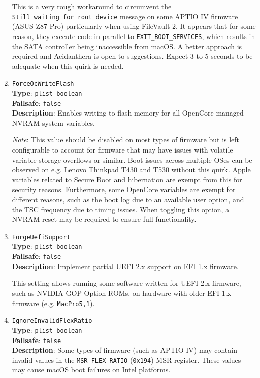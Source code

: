 \documentclass[]{article}
\begin{document}
\begin{enumerate}
  This is a very rough workaround to circumvent the \texttt{Still\ waiting\ for\ root\ device} message
  on some APTIO IV firmware (ASUS Z87-Pro) particularly when using FileVault 2.
  It appears that for some reason, they execute code in parallel to \texttt{EXIT\_BOOT\_SERVICES},
  which results in the SATA controller being inaccessible from macOS. A better approach is required
  and Acidanthera is open to suggestions. Expect 3 to 5 seconds to be adequate when this quirk is needed.

\item
  \texttt{ForceOcWriteFlash}\\
  \textbf{Type}: \texttt{plist\ boolean}\\
  \textbf{Failsafe}: \texttt{false}\\
  \textbf{Description}: Enables writing to flash memory for all OpenCore-managed NVRAM system variables.

  \emph{Note}: This value should be disabled on most types of firmware but is
  left configurable to account for firmware that may have issues with volatile
  variable storage overflows or similar. Boot issues across multiple OSes can be
  observed on e.g. Lenovo Thinkpad T430 and T530 without this quirk. Apple
  variables related to Secure Boot and hibernation are exempt from this for
  security reasons. Furthermore, some OpenCore variables are exempt for
  different reasons, such as the boot log due to an available user option, and
  the TSC frequency due to timing issues. When toggling this option, a NVRAM
  reset may be required to ensure full functionality.

\item
  \texttt{ForgeUefiSupport}\\
  \textbf{Type}: \texttt{plist\ boolean}\\
  \textbf{Failsafe}: \texttt{false}\\
  \textbf{Description}: Implement partial UEFI 2.x support on EFI 1.x firmware.

  This setting allows running some software written for UEFI 2.x firmware, such as NVIDIA GOP
  Option ROMs, on hardware with older EFI 1.x firmware (e.g. \texttt{MacPro5,1}).

\item
  \texttt{IgnoreInvalidFlexRatio}\\
  \textbf{Type}: \texttt{plist\ boolean}\\
  \textbf{Failsafe}: \texttt{false}\\
  \textbf{Description}: Some types of firmware (such as APTIO IV) may contain invalid values in the
  \texttt{MSR\_FLEX\_RATIO} (\texttt{0x194}) MSR register. These values may cause
  macOS boot failures on Intel platforms.


\end{enumerate}
\end{document}
